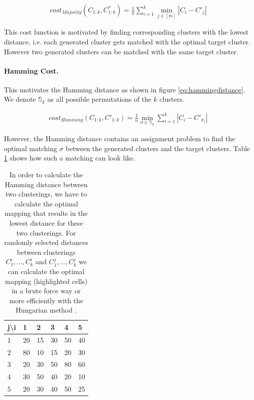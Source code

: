 \begin{equation}
    \begin{aligned}
        cost_{Majority}(C_{1:k}, C_{1:k}^*) = \frac{1}{n} \sum_{i=1}^k \min_{j \in [m]} |C_i - C'_j|
    \end{aligned}
    \label{eq:majoritydistance}
\end{equation}

This cost function is motivated by finding corresponding clusters with the lowest distance, i.e. each generated cluster gets matched with the optimal target cluster. However two generated clusters can be matched with the same target cluster. 

\paragraph{Hamming Cost.} This motivates the Hamming distance as shown in figure \ref{eq:hammingdistance}. We denote $\mathbb{S}_k$ as all possible permutations of the $k$ clusters.

\begin{equation}
    \begin{aligned}
        cost_{Hamming}(C_{1:k}, C'_{1:k}) = \frac{1}{n} \min_{\sigma \in \mathbb{S}_k} \sum_{i=1}^k |C_i - C'_{\sigma_i}|
    \end{aligned}
    \label{eq:hammingdistance}
\end{equation}

However, the Hamming distance contains an assignment problem to find the optimal matching $\sigma$ between the generated clusters and the target clusters. Table \ref{table:matching} shows how such a matching can look like.

\begin{table}[h]
    \centering
    \begin{tabular}{|l | l l l l l|}
    \hline
    j\textbackslash i & 1 & 2 & 3 & 4 & 5\\ \hline
    1 & 20 & \cellcolor{blue!25}15 & 30 & 50 & 40\\
    2 & 80 & 10 & \cellcolor{blue!25}15 & 20 & 30\\
    3 & \cellcolor{blue!25}20 & 30 & 50 & 80 & 60\\
    4 & 30 & 50 & 40 & \cellcolor{blue!25}20 & 10\\
    5 & 20 & 30 & 40 & 50 & \cellcolor{blue!25}25\\ \hline
    \end{tabular}
    \caption{In order to calculate the Hamming distance between two clusterings, we have to calculate the optimal mapping that results in the lowest distance for these two clusterings. For randomly selected distances between clusterings $C_1^i, ..., C_k^i$ and $C_1^j, ..., C_k^j$ we can calculate the optimal mapping (highlighted cells) in a brute force way or more efficiently with the Hungarian method \cite{kuhn1955hungarian, munkres1957algorithms}.}
    \label{table:matching}
\end{table}

